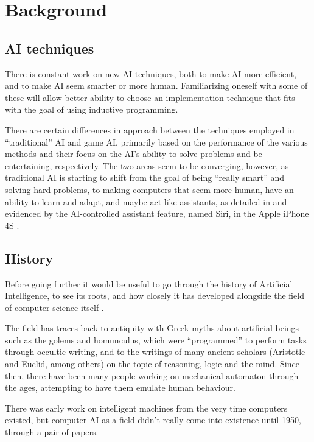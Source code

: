 \cleardoublepage
\chapter{Background}
\label{rel}
\section{AI techniques}
\label{cha:ai-techniques}

There is constant work on new AI techniques, both to make AI more efficient, and
to make AI seem smarter or more human. Familiarizing oneself with some of these
will allow better ability to choose an implementation technique that fits with
the goal of using inductive programming.

There are certain differences in approach between the techniques employed in
``traditional'' AI and game AI, primarily based on the performance of the
various methods and their focus on the AI's ability to solve problems and be
entertaining, respectively. The two areas seem to be converging, however, as
traditional AI is starting to shift from the goal of being ``really smart'' and
solving hard problems, to making computers that seem more human, have an ability
to learn and adapt, and maybe act like assistants, as detailed in
\citet{ramos2008guest} and evidenced by the AI-controlled assistant feature,
named Siri, in the Apple iPhone 4S \citep{apple2011siri}.

\section{History}
\label{sec:trad-ai-history}

Before going further it would be useful to go through the history of Artificial
Intelligence, to see its roots, and how closely it has developed alongside the
field of computer science itself \citep{luger2005artificial,buchanan2002brief}.

The field has traces back to antiquity with Greek myths about artificial beings
such as the golems and homunculus, which were ``programmed'' to perform tasks
through occultic writing, and to the writings of many ancient scholars
(Aristotle and Euclid, among others) on the topic of reasoning, logic and the
mind. Since then, there have been many people working on mechanical automaton
through the ages, attempting to have them emulate human behaviour.

There was early work on intelligent machines from the very time computers
existed, but computer AI as a field didn't really come into existence until
1950, through a pair of papers.

